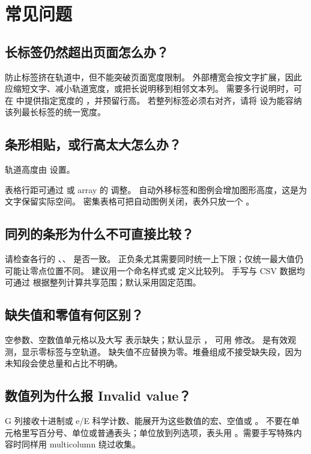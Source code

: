 \section{常见问题}
\subsection{长标签仍然超出页面怎么办？}
 防止标签挤在轨道中，但不能突破页面宽度限制。
外部槽宽会按文字扩展，因此应缩短文字、减小轨道宽度，或把长说明移到相邻文本列。
需要多行说明时，可在  中提供指定宽度的 \key{\parbox}，并预留行高。
若整列标签必须右对齐，请将  设为能容纳该列最长标签的统一宽度。

\subsection{条形相贴，或行高太大怎么办？}
轨道高度由  设置。\par
表格行距可通过
\key{\renewcommand{\arraystretch}{1.5}} 或 array 的
\key{\setlength{\extrarowheight}{3pt}} 调整。
自动外移标签和图例会增加图形高度，这是为文字保留实际空间。
密集表格可把自动图例关闭，表外只放一个 \key{\gradbarslegend}。

\subsection{同列的条形为什么不可直接比较？}
请检查各行的 、、 是否一致。
正负条尤其需要同时统一上下限；仅统一最大值仍可能让零点位置不同。
建议用一个命名样式或 \key{\gradbarscolumn} 定义比较列。
手写与 CSV 数据均可通过  根据整列计算共享范围；默认采用固定范围。

\subsection{缺失值和零值有何区别？}
空参数、空数值单元格以及大写  表示缺失；默认显示 \key{--}，
可用  修改。 是有效观测，显示零标签与空轨道。
缺失值不应替换为零。堆叠组成不接受缺失段，因为未知段会使总量和占比不明确。

\subsection{数值列为什么报 Invalid value？}
G 列接收十进制或 e/E 科学计数、能展开为这些数值的宏、空值或 。
不要在单元格里写百分号、单位或普通表头；单位放到列选项，表头用
。需要手写特殊内容时同样用 multicolumn 绕过收集。

